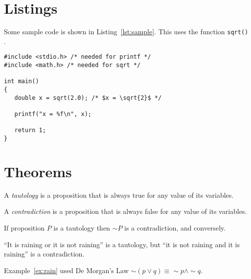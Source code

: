 \documentclass[oneside,12pt]{scrbook}
\theoremstyle{break}
\begin{document}
\section{Listings}

Some sample code is shown in Listing~\ref{lst:sample}.  
This uses the function \lstinline"sqrt()"%
%
%
.

\begin{lstlisting}[mathescape=true,caption={Sample},label={lst:sample}]
#include <stdio.h> /* needed for printf */
#include <math.h> /* needed for sqrt */

int main()
{
   double x = sqrt(2.0); /* $x = \sqrt{2}$ */

   printf("x = %f\n", x);

   return 1;
}
\end{lstlisting} 

\section{Theorems}

\begin{Definition}[Tautology]
A \emph{tautology} is a proposition 
that is always true for any value of its variables.
\end{Definition}

\begin{Definition}[Contradiction]
A \emph{contradiction} is a 
proposition that is always false for any
value of its variables.
\end{Definition}

\begin{Theorem}
If proposition $P$ is a tautology
then $\sim P$ is a contradiction,
and conversely.
\end{Theorem}

\begin{Example}\label{ex:rain}
``It is raining or it is not raining'' is a tautology,
but ``it is not raining and it is raining'' is a contradiction.
\end{Example}

\begin{Remark}
Example~\ref{ex:rain} used De Morgan’s Law
$\sim (p \vee q) \equiv \sim p \wedge \sim q$.
\end{Remark}
\end{document}

